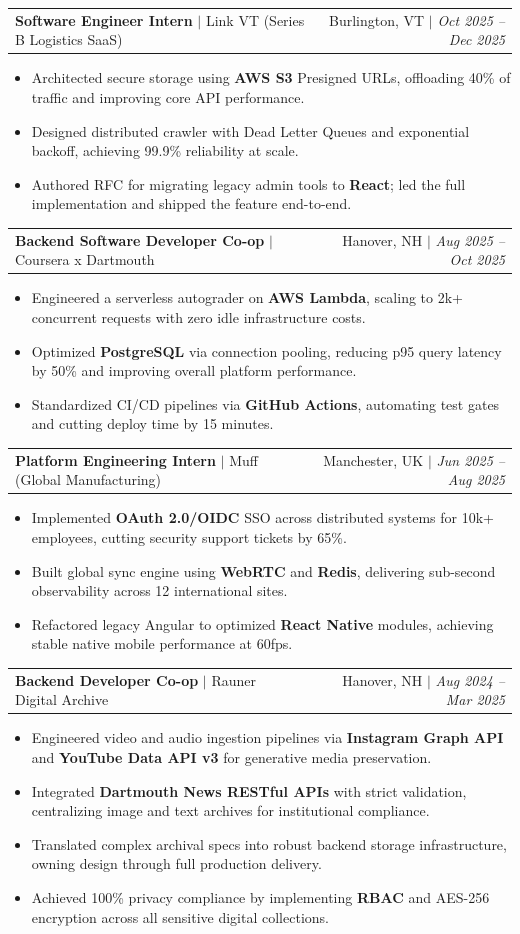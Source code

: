 \documentclass[letterpaper,10pt]{article}
\makeatletter
\newcommand{\resumeItem}[1]{
  \item\small{#1\vspace{-1pt}}
}
\newcommand{\resumeSubheading}[4]{
  \vspace{-1pt}\item
    \begin{tabular*}{0.97\textwidth}[t]{l@{\extracolsep{\fill}}r}
      \textbf{#3} $|$ #1 & #2 $|$ \textit{\small #4} \\
    \end{tabular*}\vspace{-5pt}
}
\newcommand{\resumeItemListStart}{\begin{itemize}[leftmargin=0.15in]}
\newcommand{\resumeItemListEnd}{\end{itemize}\vspace{-2pt}}
\makeatother
\begin{document}
    \resumeSubheading
      {Link VT (Series B Logistics SaaS)}{Burlington, VT}
      {Software Engineer Intern}{Oct 2025 -- Dec 2025}
      \resumeItemListStart
        \resumeItem{Architected secure storage using \textbf{AWS S3} Presigned URLs, offloading 40\% of traffic and improving core API performance.}
        \resumeItem{Designed distributed crawler with Dead Letter Queues and exponential backoff, achieving 99.9\% reliability at scale.}
        \resumeItem{Authored RFC for migrating legacy admin tools to \textbf{React}; led the full implementation and shipped the feature end-to-end.}
      \resumeItemListEnd

    \resumeSubheading
      {Coursera x Dartmouth}{Hanover, NH}
      {Backend Software Developer Co-op}{Aug 2025 -- Oct 2025}
      \resumeItemListStart
        \resumeItem{Engineered a serverless autograder on \textbf{AWS Lambda}, scaling to 2k+ concurrent requests with zero idle infrastructure costs.}
        \resumeItem{Optimized \textbf{PostgreSQL} via connection pooling, reducing p95 query latency by 50\% and improving overall platform performance.}
        \resumeItem{Standardized CI/CD pipelines via \textbf{GitHub Actions}, automating test gates and cutting deploy time by 15 minutes.}
      \resumeItemListEnd

    \resumeSubheading
      {Muff (Global Manufacturing)}{Manchester, UK}
      {Platform Engineering Intern}{Jun 2025 -- Aug 2025}
      \resumeItemListStart
        \resumeItem{Implemented \textbf{OAuth 2.0/OIDC} SSO across distributed systems for 10k+ employees, cutting security support tickets by 65\%.}
        \resumeItem{Built global sync engine using \textbf{WebRTC} and \textbf{Redis}, delivering sub-second observability across 12 international sites.}
        \resumeItem{Refactored legacy Angular to optimized \textbf{React Native} modules, achieving stable native mobile performance at 60fps.}
      \resumeItemListEnd

    \resumeSubheading
      {Rauner Digital Archive}{Hanover, NH}
      {Backend Developer Co-op}{Aug 2024 -- Mar 2025}
      \resumeItemListStart
        \resumeItem{Engineered video and audio ingestion pipelines via \textbf{Instagram Graph API} and \textbf{YouTube Data API v3} for generative media preservation.}
        \resumeItem{Integrated \textbf{Dartmouth News RESTful APIs} with strict validation, centralizing image and text archives for institutional compliance.}
        \resumeItem{Translated complex archival specs into robust backend storage infrastructure, owning design through full production delivery.}
        \resumeItem{Achieved 100\% privacy compliance by implementing \textbf{RBAC} and AES-256 encryption across all sensitive digital collections.}
      \resumeItemListEnd
\end{document}
